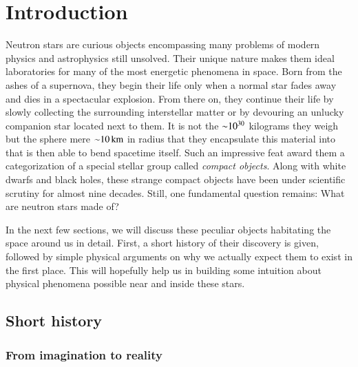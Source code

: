 \chapter{Introduction} 

Neutron stars are curious objects encompassing many problems of modern physics and astrophysics still unsolved.
Their unique nature makes them ideal laboratories for many of the most energetic phenomena in space.
Born from the ashes of a supernova, they begin their life only when a normal star fades away and dies in a spectacular explosion.%
From there on, they continue their life by slowly collecting the surrounding interstellar matter or by devouring an unlucky companion star located next to them.
It is not the $\mathord{\sim} 10^{30}$ kilograms they weigh but the sphere mere $\mathord{\sim} 10 \, \mathrm{km}$ in radius that they encapsulate this material into that is then able to bend spacetime itself.
Such an impressive feat award them a categorization of a special stellar group called \textit{compact objects}.
Along with white dwarfs and black holes, these strange compact objects have been under scientific scrutiny for almost nine decades.
Still, one fundamental question remains:
What are neutron stars made of?

In the next few sections, we will discuss these peculiar objects habitating the space around us in detail.
First, a short history of their discovery is given, followed by simple physical arguments on why we actually expect them to exist in the first place.
This will hopefully help us in building some intuition about physical phenomena possible near and inside these stars.


\section{Short history}
\subsection{From imagination to reality}

